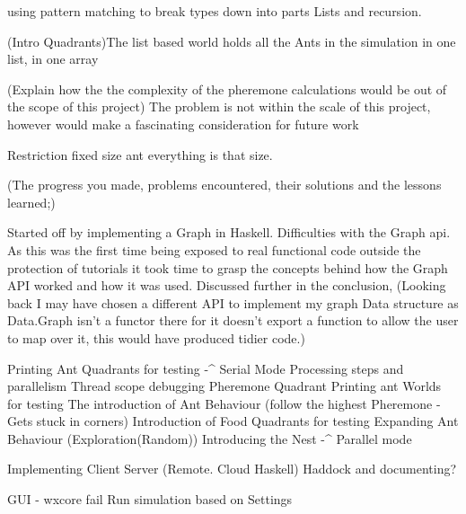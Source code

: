 \documentclass[main.tex]{subfiles}
\begin{document}





using pattern matching to break types down into parts Lists and recursion.

(Intro Quadrants)The list based world holds all the Ants in the simulation in one list, 
in one array

(Explain how the the complexity of the pheremone calculations would be out of the scope of this project)
The problem is not within the scale of this project, however would make a fascinating consideration for future work

Restriction fixed size ant everything is that size.


(The progress you made, problems encountered,
their solutions and the lessons learned;)

Started off by implementing a Graph in Haskell. Difficulties with the Graph api. As this was the first time being exposed to real functional code outside the protection of tutorials it took time to grasp the concepts behind how the Graph API worked and how it was used. Discussed further in the conclusion, (Looking back I may have chosen a different API to implement my graph Data structure as Data.Graph isn't a functor there for it doesn't export a function to allow the user to map over it, this would have produced tidier code.)



Printing Ant Quadrants for testing -^ Serial Mode
Processing steps and parallelism
Thread scope debugging
Pheremone Quadrant
Printing ant Worlds for testing
The introduction of Ant Behaviour (follow the highest Pheremone - Gets stuck in corners)
Introduction of Food Quadrants for testing
Expanding Ant Behaviour (Exploration(Random))
Introducing the Nest -^ Parallel mode

Implementing Client Server (Remote. Cloud Haskell) 
Haddock and documenting?

GUI - wxcore fail
Run simulation based on Settings
\end{document}
